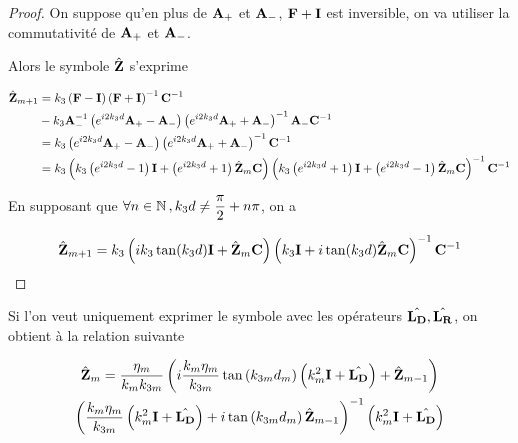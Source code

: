 \begin{proof}
            On suppose qu'en plus de \(\mathbf{A}_+\) et \(\mathbf{A}_-\), \(\mathbf{F} + \mathbf{I}\) est inversible, on va utiliser la commutativité de \(\mathbf{A}_+\) et \(\mathbf{A}_-\).

            Alors le symbole \(\hat {\mathbf{Z}}\) s'exprime

            \begin{align}
                \hat{\mathbf{Z}}_{m+1}
                &=k_3\left(\mathbf{F} - \mathbf{I} \right)\left(\mathbf{F}+ \mathbf{I} \right)^{-1}\mathbf{C}^{-1}
                \\
                &-k_3\mathbf{A}_-^{-1}\left(e^{i2 k_3 d}\mathbf{A}_+ - \mathbf{A}_- \right)\left(e^{i2 k_3 d}\mathbf{A}_+ + \mathbf{A}_- \right)^{-1}\mathbf{A}_-\mathbf{C}^{-1}
                \\
                &=k_3\left( e^{i2 k_3 d} \mathbf{A}_+ -  \mathbf{A}_-\right)
                \left( e^{i2 k_3 d} \mathbf{A}_+ + \mathbf{A}_- \right)^{-1}\mathbf{C}^{-1}
                \\
                &=k_3\left(k_3\left( e^{i2 k_3 d} - 1 \right)\mathbf{I} + \left( e^{i2 k_3 d} + 1 \right) \hat{\mathbf{Z}}_m\mathbf{C} \right)
                \left( k_3\left( e^{i2 k_3 d} + 1 \right)\mathbf{I} + \left( e^{i2 k_3 d} - 1 \right)\hat{\mathbf{Z}}_m\mathbf{C} \right)^{-1}\mathbf{C}^{-1}
            \end{align}

            En supposant que \(\forall n \in \mathbb N \,, k_3d\not = \dfrac{\pi}{2}+n\pi\), on a

            \begin{equation}
                \hat{\mathbf{Z}}_{m+1} = k_3\left(ik_3\tan(k_3 d)\mathbf{I} + \hat{\mathbf{Z}}_m\mathbf{C} \right)
                    \left( k_3\mathbf{I} + i\tan(k_3 d)\hat{\mathbf{Z}}_m\mathbf{C} \right)^{-1}\mathbf{C}^{-1}
            \end{equation}


        \end{proof}

        Si l'on veut uniquement exprimer le symbole avec les opérateurs \(\hat{\mathbf{L_D}}, \hat{\mathbf{L_R}}\), on obtient à la relation suivante

        \begin{multline}
            \hat {\mathbf{Z}}_m = \dfrac{\eta_m}{k_mk_{3m}}
            \left(i\dfrac{k_{m}\eta_m}{k_{3m}}\tan\left(k_{3m}d_m\right)\left(k_m^2\mathbf{I}+\hat{\mathbf{L_D}}\right) + \hat {\mathbf{Z}}_{m-1}\right) \\
            \left(\dfrac{k_{m}\eta_m}{k_{3m}}\left(k_m^2\mathbf{I}+\hat{\mathbf{L_D}}\right) + i\tan\left(k_{3m}d_m\right)\hat {\mathbf{Z}}_{m-1}\right)^{-1}
            \left(k_m^2\mathbf{I}+\hat{\mathbf{L_D}}\right)
        \end{multline}  

